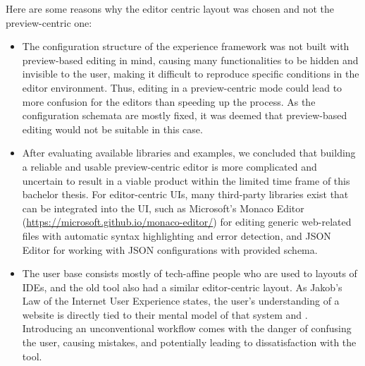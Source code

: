 \bigskip
Here are some reasons why the editor centric layout was chosen and not the preview-centric one:
\begin{itemize}
  \item The configuration structure of the \Gls{experience} framework was not built with preview-based editing in mind, causing many functionalities to be hidden and invisible to the user, making it difficult to reproduce specific conditions in the editor environment.
  Thus, editing in a preview-centric mode could lead to more confusion for the editors than speeding up the process.
  As the configuration schemata are mostly fixed, it was deemed that preview-based editing would not be suitable in this case.
  \item After evaluating available libraries and examples, we concluded that building a reliable and usable preview-centric editor is more complicated and uncertain to result in a viable product within the limited time frame of this bachelor thesis.
  For editor-centric UIs, many third-party libraries exist that can be integrated into the UI, such as Microsoft's Monaco Editor (\url{https://microsoft.github.io/monaco-editor/}) for editing generic web-related files with automatic syntax highlighting and error detection, and JSON Editor for working with JSON configurations with provided schema.
  \item The user base consists mostly of tech-affine people who are used to layouts of IDEs, and the old tool also had a similar editor-centric layout.
  As Jakob's Law of the Internet User Experience states, the user's understanding of a website is directly tied to their mental model of that system \cite{Nielsen:2000} and \cite[p. 2]{LawsOfUX:2020ys}. Introducing an unconventional workflow comes with the danger of confusing the user, causing mistakes, and potentially leading to dissatisfaction with the tool.
 
\end{itemize}

